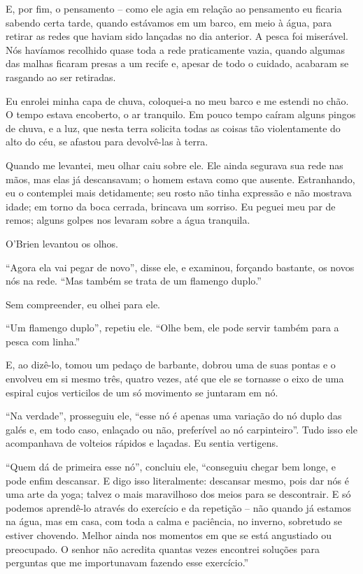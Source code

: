 E, por fim, o pensamento -- como ele agia em relação ao pensamento eu
ficaria sabendo certa tarde, quando estávamos em um barco, em meio à
água, para retirar as redes que haviam sido lançadas no dia anterior. A
pesca foi miserável. Nós havíamos recolhido quase toda a rede
praticamente vazia, quando algumas das malhas ficaram presas a um recife
e, apesar de todo o cuidado, acabaram se rasgando ao ser retiradas.

Eu enrolei minha capa de chuva, coloquei-a no meu barco e me estendi no
chão. O tempo estava encoberto, o ar tranquilo. Em pouco tempo caíram
alguns pingos de chuva, e a luz, que nesta terra solicita todas as
coisas tão violentamente do alto do céu, se afastou para devolvê-las à
terra.

Quando me levantei, meu olhar caiu sobre ele. Ele ainda segurava sua
rede nas mãos, mas elas já descansavam; o homem estava como que ausente.
Estranhando, eu o contemplei mais detidamente; seu rosto não tinha
expressão e não mostrava idade; em torno da boca cerrada, brincava um
sorriso. Eu peguei meu par de remos; alguns golpes nos levaram sobre a
água tranquila.

O'Brien levantou os olhos.

``Agora ela vai pegar de novo'', disse ele, e examinou, forçando
bastante, os novos nós na rede. ``Mas também se trata de um flamengo
duplo.''

Sem compreender, eu olhei para ele.

``Um flamengo duplo'', repetiu ele. ``Olhe bem, ele pode servir também
para a pesca com linha.''

E, ao dizê-lo, tomou um pedaço de barbante, dobrou uma de suas pontas e
o envolveu em si mesmo três, quatro vezes, até que ele se tornasse o
eixo de uma espiral cujos verticilos de um só movimento se juntaram em
nó.

``Na verdade'', prosseguiu ele, ``esse nó é apenas uma variação do nó
duplo das galés e, em todo caso, enlaçado ou não, preferível ao nó
carpinteiro''. Tudo isso ele acompanhava de volteios rápidos e laçadas.
Eu sentia vertigens.

``Quem dá de primeira esse nó'', concluiu ele, ``conseguiu chegar bem
longe, e pode enfim descansar. E digo isso literalmente: descansar
mesmo, pois dar nós é uma arte da yoga; talvez o mais maravilhoso dos
meios para se descontrair. E só podemos aprendê-lo através do exercício
e da repetição -- não quando já estamos na água, mas em casa, com toda a
calma e paciência, no inverno, sobretudo se estiver chovendo. Melhor
ainda nos momentos em que se está angustiado ou preocupado. O senhor não
acredita quantas vezes encontrei soluções para perguntas que me
importunavam fazendo esse exercício.''

